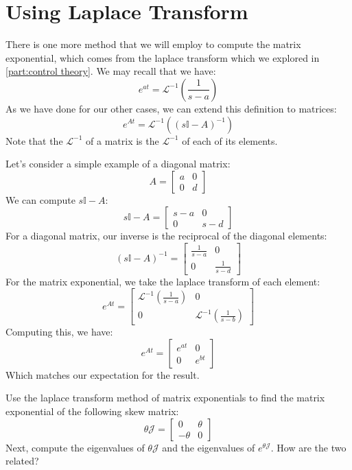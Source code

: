 
\section{Using Laplace Transform}

There is one more method that we will employ to compute the matrix exponential, which comes from the \gls{laplace transform} which we explored in \autoref{part:control theory}. We may recall that we have:
$$e^{at} = \mathscr{L}^{-1}\left(\frac{1}{s-a}\right)$$
As we have done for our other cases, we can extend this definition to matrices:
$$e^{At} = \mathscr{L}^{-1}\left(\left(s\mathbb{I}-A\right)^{-1}\right)$$
Note that the $\mathscr{L}^{-1}$ of a matrix is the $\mathscr{L}^{-1}$ of each of its elements.

\begin{example}
Let's consider a simple example of a diagonal matrix:
$$A=\begin{bmatrix}
    a&0\\0&d
\end{bmatrix}$$
We can compute $s\mathbb{I}-A$:
$$s\mathbb{I}-A=\begin{bmatrix}
    s-a&0\\0&s-d
\end{bmatrix}$$
For a diagonal matrix, our inverse is the reciprocal of the diagonal elements:
$$\left(s\mathbb{I}-A\right)^{-1}=\begin{bmatrix}
    \frac{1}{s-a}&0\\0&\frac{1}{s-d}
\end{bmatrix}$$
For the matrix exponential, we take the \gls{laplace transform} of each element:
$$e^{At}=\begin{bmatrix}
    \mathscr{L}^{-1}\left(\frac{1}{s-a}\right)&0\\0&\mathscr{L}^{-1}\left(\frac{1}{s-b}\right)
\end{bmatrix}$$
Computing this, we have:
$$e^{At}=\begin{bmatrix}
    e^{at}&0\\0&e^{bt}
\end{bmatrix}$$
Which matches our expectation for the result. 
\end{example}
\begin{exercise}
    Use the \gls{laplace transform} method of matrix exponentials to find the matrix exponential of the following skew matrix:
    $$\theta\mathcal{J}=\begin{bmatrix}
        0&\theta\\-\theta&0
    \end{bmatrix}$$
Next, compute the eigenvalues of $\theta\mathcal{J}$ and the eigenvalues of $e^{\theta\mathcal{J}}$. How are the two related? 
\end{exercise}

